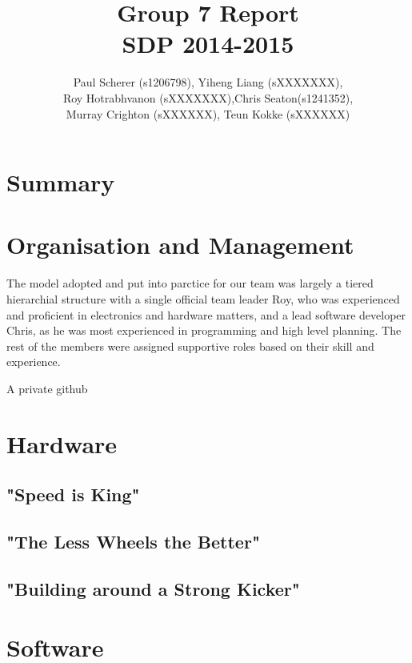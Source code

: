 \documentclass[12pt,a4paper]{article}
\begin{document}
	\title{Group 7 Report\\
		SDP 2014-2015}
\author{Paul Scherer (s1206798), Yiheng Liang (sXXXXXXX),\\ Roy Hotrabhvanon (sXXXXXXX),Chris Seaton(s1241352),\\ Murray Crighton (sXXXXXX), Teun Kokke (sXXXXXX)}
\maketitle
	
\section{Summary}


\section{Organisation and Management}
The model adopted and put into parctice for our team was largely a tiered hierarchial structure with a single official team leader Roy, who was experienced and proficient in electronics and hardware matters, and a lead software developer Chris, as he was most experienced in programming and high level planning. The rest of the members were assigned supportive roles based on their skill and experience. 

A private github

\section{Hardware}
\subsection{"Speed is King"}
\subsection{"The Less Wheels the Better"}
\subsection{"Building around a Strong Kicker"}


\section{Software}
\end{document}
